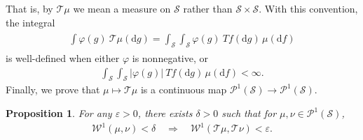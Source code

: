 \documentclass[11pt,reqno]{amsart}
\numberwithin{equation}{section}
\newtheorem{prop}[thm]{Proposition}
\theoremstyle{definition}
\begin{document}
That is, by ${\mathcal{T}}\mu$ we mean a measure on ${\mathcal{S}}$ rather than ${\mathcal{S}} \times {\mathcal{S}}$.
With this convention, the integral
{\begin{align} \begin{split} {
\int {\varphi}(g)\ {\mathcal{T}}\mu({\mathrm{d}} g) = \int_{\mathcal{S}} \int_{\mathcal{S}} {\varphi}(g)\ Tf({\mathrm{d}} g)\, \mu({\mathrm{d}} f) \label{T_fubini}
} \end{split} \end{align}}
is well-defined when either ${\varphi}$ is nonnegative, or
{\begin{align*} {
\int_{\mathcal{S}} \int_{\mathcal{S}} |{\varphi}(g)|\ Tf({\mathrm{d}} g)\,\mu({\mathrm{d}} f) < \infty. 
} \end{align*}}
Finally, we prove that $\mu \mapsto {\mathcal{T}}\mu$ is a continuous map ${\mathcal{P}}^1({\mathcal{S}}) \to {\mathcal{P}}^1({\mathcal{S}})$.

\begin{prop} \label{continuous2}
For any ${\varepsilon} > 0$, there exists $\delta > 0$ such that for $\mu,\nu \in {\mathcal{P}}^1({\mathcal{S}})$,
{\begin{align*} {
{\mathcal{W}}^1(\mu,\nu) < \delta \quad \Rightarrow \quad {\mathcal{W}}^1({\mathcal{T}}\mu,{\mathcal{T}}\nu) < {\varepsilon}.
} \end{align*}}
\end{prop}
\end{document}
